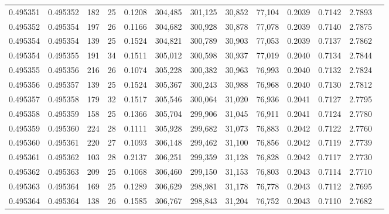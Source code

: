 \begin{tabular}{rrrrrrrrrrrrr}
0.495351 & 0.495352 & 182 &  25 &                                     0.1208 & 304,485 & 301,125 &  30,852 &  77,104 & 0.2039 & 0.7142 & 2.7893 \\
0.495352 & 0.495354 & 197 &  26 &                                     0.1166 & 304,682 & 300,928 &  30,878 &  77,078 & 0.2039 & 0.7140 & 2.7875 \\
0.495354 & 0.495354 & 139 &  25 &                                     0.1524 & 304,821 & 300,789 &  30,903 &  77,053 & 0.2039 & 0.7137 & 2.7862 \\
0.495354 & 0.495355 & 191 &  34 &                                     0.1511 & 305,012 & 300,598 &  30,937 &  77,019 & 0.2040 & 0.7134 & 2.7844 \\
0.495355 & 0.495356 & 216 &  26 &                                     0.1074 & 305,228 & 300,382 &  30,963 &  76,993 & 0.2040 & 0.7132 & 2.7824 \\
0.495356 & 0.495357 & 139 &  25 &                                     0.1524 & 305,367 & 300,243 &  30,988 &  76,968 & 0.2040 & 0.7130 & 2.7812 \\
0.495357 & 0.495358 & 179 &  32 &                                     0.1517 & 305,546 & 300,064 &  31,020 &  76,936 & 0.2041 & 0.7127 & 2.7795 \\
0.495358 & 0.495359 & 158 &  25 &                                     0.1366 & 305,704 & 299,906 &  31,045 &  76,911 & 0.2041 & 0.7124 & 2.7780 \\
0.495359 & 0.495360 & 224 &  28 &                                     0.1111 & 305,928 & 299,682 &  31,073 &  76,883 & 0.2042 & 0.7122 & 2.7760 \\
0.495360 & 0.495361 & 220 &  27 &                                     0.1093 & 306,148 & 299,462 &  31,100 &  76,856 & 0.2042 & 0.7119 & 2.7739 \\
0.495361 & 0.495362 & 103 &  28 &                                     0.2137 & 306,251 & 299,359 &  31,128 &  76,828 & 0.2042 & 0.7117 & 2.7730 \\
0.495362 & 0.495363 & 209 &  25 &                                     0.1068 & 306,460 & 299,150 &  31,153 &  76,803 & 0.2043 & 0.7114 & 2.7710 \\
0.495363 & 0.495364 & 169 &  25 &                                     0.1289 & 306,629 & 298,981 &  31,178 &  76,778 & 0.2043 & 0.7112 & 2.7695 \\
0.495364 & 0.495364 & 138 &  26 &                                     0.1585 & 306,767 & 298,843 &  31,204 &  76,752 & 0.2043 & 0.7110 & 2.7682 \\

\end{tabular}
